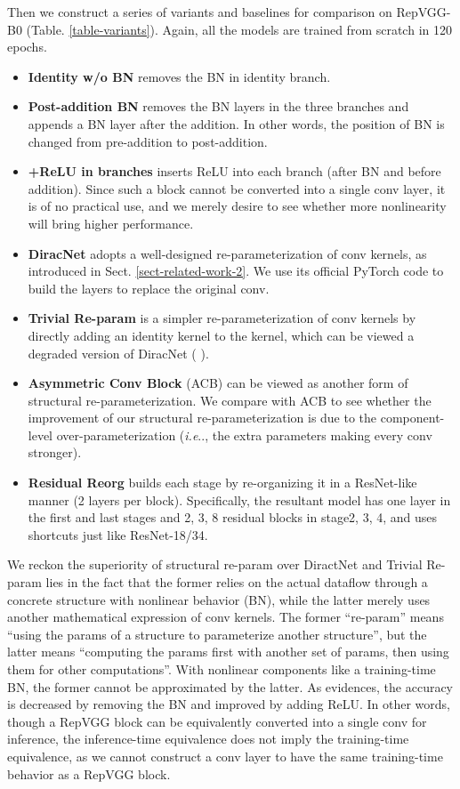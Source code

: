 \documentclass[final]{cvpr}
\makeatletter
\DeclareRobustCommand\onedot{\futurelet\@let@token\@onedot}
\def\@onedot{\ifx\@let@token.\else.\null\fi\xspace}
\def\ie{\emph{i.e}\onedot}
\makeatother
\begin{document}
Then we construct a series of variants and baselines for comparison on RepVGG-B0 (Table. \ref{table-variants}). Again, all the models are trained from scratch in 120 epochs.
\begin{itemize}[noitemsep,nolistsep,topsep=0pt,parsep=0pt,partopsep=0pt]
	\item \textbf{Identity w/o BN} removes the BN in identity branch.
	\item \textbf{Post-addition BN} removes the BN layers in the three branches and appends a BN layer after the addition. In other words, the position of BN is changed from pre-addition to post-addition.
	\item \textbf{+ReLU in branches} inserts ReLU into each branch (after BN and before addition). Since such a block cannot be converted into a single conv layer, it is of no practical use, and we merely desire to see whether more nonlinearity will bring higher performance.
	\item \textbf{DiracNet} \cite{zagoruyko2017diracnets} adopts a well-designed re-parameterization of conv kernels, as introduced in Sect. \ref{sect-related-work-2}. We use its official PyTorch code to build the layers to replace the original  conv.
	\item \textbf{Trivial Re-param} is a simpler re-parameterization of conv kernels by directly adding an identity kernel to the  kernel, which can be viewed a degraded version of DiracNet ( \cite{zagoruyko2017diracnets}).
	\item \textbf{Asymmetric Conv Block} (ACB) \cite{ding2019acnet} can be viewed as another form of structural re-parameterization. We compare with ACB to see whether the improvement of our structural re-parameterization is due to the component-level over-parameterization (\ie, the extra parameters making every  conv stronger).
	\item \textbf{Residual Reorg} builds each stage by re-organizing it in a ResNet-like manner (2 layers per block). Specifically, the resultant model has one  layer in the first and last stages and 2, 3, 8 residual blocks in stage2, 3, 4, and uses shortcuts just like ResNet-18/34.
\end{itemize}

We reckon the superiority of structural re-param over DiractNet and Trivial Re-param lies in the fact that the former relies on the actual dataflow through a concrete structure with nonlinear behavior (BN), while the latter merely uses another mathematical expression of conv kernels. The former ``re-param'' means ``using the params of a structure to parameterize another structure'', but the latter means ``computing the params first with another set of params, then using them for other computations''. With nonlinear components like a training-time BN, the former cannot be approximated by the latter. As evidences, the accuracy is decreased by removing the BN and improved by adding ReLU. In other words, though a RepVGG block can be equivalently converted into a single conv for inference, the inference-time equivalence does not imply the training-time equivalence, as we cannot construct a conv layer to have the same training-time behavior as a RepVGG block. 
\end{document}

